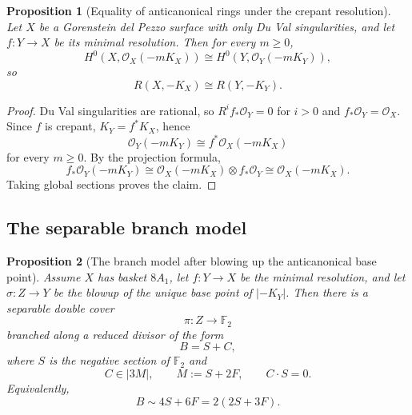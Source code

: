 \documentclass[11pt]{article}
\newtheorem{proposition}[proposition]{Proposition}
\theoremstyle{definition}
\begin{document}
\begin{proposition}[Equality of anticanonical rings under the crepant resolution]\label{prop:ring-equality}
Let $X$ be a Gorenstein del Pezzo surface with only Du Val singularities, and let $f\colon Y\to X$ be its minimal resolution. Then for every $m\ge 0$,
\[
H^0(X,\mathcal O_X(-mK_X))\cong H^0(Y,\mathcal O_Y(-mK_Y)),
\]
so
\[
R(X,-K_X)\cong R(Y,-K_Y).
\]
\end{proposition}

\begin{proof}
Du Val singularities are rational, so $R^if_*\mathcal O_Y=0$ for $i>0$ and $f_*\mathcal O_Y=\mathcal O_X$. Since $f$ is crepant, $K_Y=f^*K_X$, hence
\[
\mathcal O_Y(-mK_Y)\cong f^*\mathcal O_X(-mK_X)
\]
for every $m\ge 0$. By the projection formula,
\[
f_*\mathcal O_Y(-mK_Y)\cong \mathcal O_X(-mK_X)\otimes f_*\mathcal O_Y\cong \mathcal O_X(-mK_X).
\]
Taking global sections proves the claim.
\end{proof}

\subsection{The separable branch model}

\begin{proposition}[The branch model after blowing up the anticanonical base point]\label{prop:branch-model}
Assume $X$ has basket $8A_1$, let $f\colon Y\to X$ be the minimal resolution, and let $\sigma\colon Z\to Y$ be the blowup of the unique base point of $|-K_Y|$. Then there is a separable double cover
\[
\pi\colon Z\to \mathbb F_2
\]
branched along a reduced divisor of the form
\[
B=S+C,
\]
where $S$ is the negative section of $\mathbb F_2$ and
\[
C\in |3M|,\qquad M:=S+2F,
\qquad C\cdot S=0.
\]
Equivalently,
\[
B\sim 4S+6F=2(2S+3F).
\]
\end{proposition}
\end{document}
